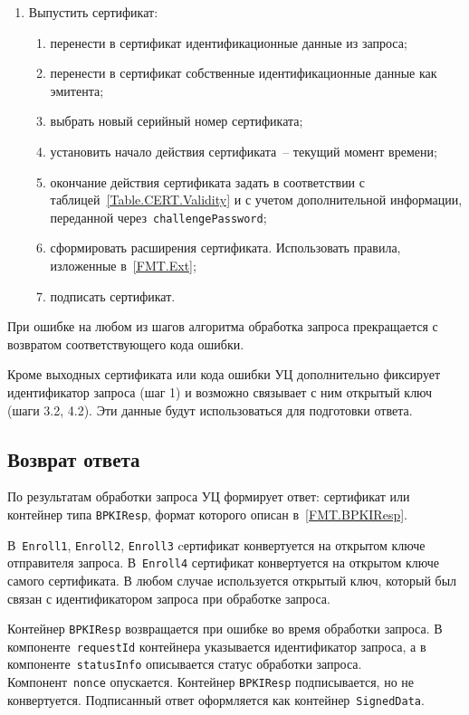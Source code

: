 \begin{enumerate}
\item
Выпустить сертификат:
\begin{enumerate}
\item
перенести в сертификат идентификационные данные из запроса;
\item
перенести в сертификат собственные идентификационные данные как эмитента;
\item
выбрать новый серийный номер сертификата;
\item
установить начало действия сертификата~-- текущий момент времени;
\item
окончание действия сертификата задать в соответствии с 
таблицей~\ref{Table.CERT.Validity} и с учетом дополнительной информации, 
переданной через~\texttt{challengePassword}; 
\item
сформировать расширения сертификата. Использовать правила,
изложенные в~\ref{FMT.Ext};
\item
подписать сертификат.
\end{enumerate}
\end{enumerate}

При ошибке на любом из шагов алгоритма обработка запроса 
прекращается с возвратом соответствующего кода ошибки.

Кроме выходных сертификата или кода ошибки 
УЦ дополнительно фиксирует идентификатор запроса (шаг 1)
и возможно связывает с ним открытый ключ (шаги 3.2, 4.2). 
Эти данные будут использоваться для подготовки ответа.


\subsection{Возврат ответа}\label{PROCESSES.Enroll.Resp}

По результатам обработки запроса УЦ формирует ответ: сертификат или 
контейнер типа \texttt{BPKIResp}, формат которого описан 
в~\ref{FMT.BPKIResp}. 

В~\texttt{Enroll1}, \texttt{Enroll2}, \texttt{Enroll3}
cертификат конвертуется на открытом ключе отправителя запроса.
В~\texttt{Enroll4} сертификат конвертуется на открытом ключе самого сертификата. 
%
В любом случае используется открытый ключ, который был связан с 
идентификатором запроса при обработке запроса.

Контейнер \texttt{BPKIResp} возвращается при ошибке во время обработки
запроса. В компоненте~\texttt{requestId} контейнера указывается идентификатор 
запроса, а в компоненте~\texttt{statusInfo} описывается статус обработки 
запроса. Компонент~\texttt{nonce} опускается.
%
Контейнер \texttt{BPKIResp} подписывается, но не конвертуется.
%
Подписанный ответ оформляется как контейнер~\texttt{SignedData}.

